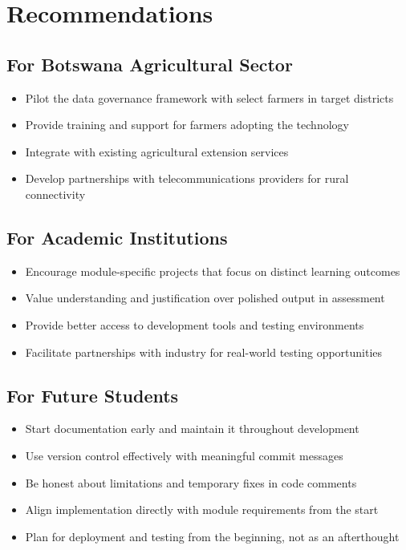 \section{Recommendations}

\subsection{For Botswana Agricultural Sector}

\begin{itemize}
    \item Pilot the data governance framework with select farmers in target districts
    \item Provide training and support for farmers adopting the technology
    \item Integrate with existing agricultural extension services
    \item Develop partnerships with telecommunications providers for rural connectivity
\end{itemize}

\subsection{For Academic Institutions}

\begin{itemize}
    \item Encourage module-specific projects that focus on distinct learning outcomes
    \item Value understanding and justification over polished output in assessment
    \item Provide better access to development tools and testing environments
    \item Facilitate partnerships with industry for real-world testing opportunities
\end{itemize}

\subsection{For Future Students}

\begin{itemize}
    \item Start documentation early and maintain it throughout development
    \item Use version control effectively with meaningful commit messages
    \item Be honest about limitations and temporary fixes in code comments
    \item Align implementation directly with module requirements from the start
    \item Plan for deployment and testing from the beginning, not as an afterthought
\end{itemize}

